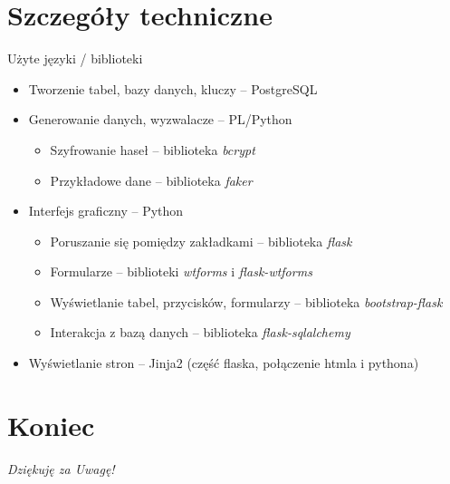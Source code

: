 \documentclass[handout]{beamer}
\begin{document}
    \section{Szczegóły techniczne}
        \begin{frame}{Użyte języki / biblioteki}
            \begin{itemize}
                \item Tworzenie tabel, bazy danych, kluczy -- PostgreSQL
                \item Generowanie danych, wyzwalacze -- PL/Python
                \begin{itemize}
                    \item Szyfrowanie haseł -- biblioteka \textit{bcrypt}
                    \item Przykładowe dane -- biblioteka \textit{faker}
                \end{itemize}
                \item Interfejs graficzny -- Python
                \begin{itemize}
                    \item Poruszanie się pomiędzy zakładkami -- biblioteka \textit{flask}
                    \item Formularze -- biblioteki \textit{wtforms} i \textit{flask-wtforms}
                    \item Wyświetlanie tabel, przycisków, formularzy -- biblioteka \textit{bootstrap-flask}
                    \item Interakcja z bazą danych -- biblioteka \textit{flask-sqlalchemy}
                \end{itemize}
                \item Wyświetlanie stron -- Jinja2 (część flaska, połączenie htmla i pythona)
            \end{itemize}
        \end{frame}
        
    \section{Koniec}
        \begin{frame}
            \centering \LARGE
            \emph{Dziękuję za Uwagę!}
        \end{frame}
\end{document}
